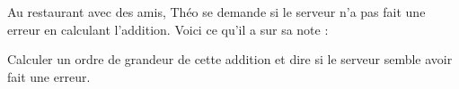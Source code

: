 \begin{exercice}
    Au restaurant avec des amis, Théo se demande si le serveur n'a pas
 fait une erreur en calculant l'addition. Voici ce qu'il a sur sa note :
    \begin{center}
    \end{center}
    Calculer un ordre de grandeur de cette addition et dire si le serveur semble avoir fait une erreur.
 \end{exercice}
